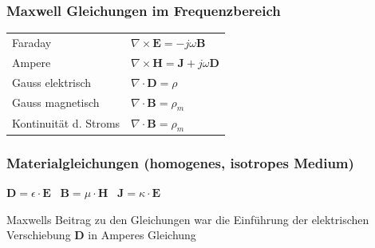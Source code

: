 \documentclass[english]{latex4ei/latex4ei_sheet}
\begin{document}
\begin{sectionbox}


	\subsubsection{Maxwell Gleichungen im Frequenzbereich}
	\begin{tabular*}{\columnwidth}{ll}
		Faraday &$\nabla \times \mathbf{E} = -j\omega \mathbf{B}$ \\
		Ampere &$\nabla \times \mathbf{H} = \mathbf{J} + j\omega\mathbf{D}$\\
		Gauss elektrisch &$\nabla \cdot \mathbf{D} = \rho$ \\
		Gauss magnetisch &$\nabla \cdot \mathbf{B} = \rho_m$ \\
		Kontinuität d. Stroms &$\nabla \cdot \mathbf{B} = \rho_m$
	\end{tabular*}

	\subsubsection{Materialgleichungen (homogenes, isotropes Medium)}
	\begin{emphbox}
	\large $\mathbf{D} = \epsilon \cdot \mathbf{E}$ \quad\ $\mathbf{B} = \mu \cdot \mathbf{H}$ \quad\ $\mathbf{J} = \kappa \cdot \mathbf{E}$
	\end{emphbox}

	Maxwells Beitrag zu den Gleichungen war die Einführung der elektrischen Verschiebung $\mathbf{D}$ in Amperes Gleichung
\end{sectionbox}
\end{document}
